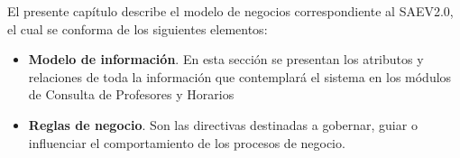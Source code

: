 
El presente capítulo describe el modelo de negocios correspondiente al SAEV2.0, el cual se conforma de los siguientes elementos:

\begin{itemize}
	
    \item \textbf{Modelo de información}. En esta sección se presentan los atributos y relaciones de toda la información que contemplará el sistema en los módulos de Consulta de Profesores y Horarios

    \item \textbf{Reglas de negocio}. Son las directivas destinadas a gobernar, guiar o influenciar el comportamiento de los procesos de negocio.
     
\end{itemize}

